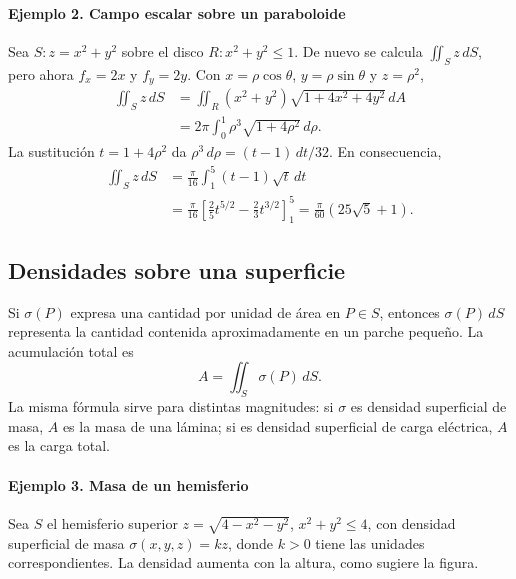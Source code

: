 \paragraph{Ejemplo 2. Campo escalar sobre un paraboloide}
Sea $S:z=x^2+y^2$ sobre el disco $R:x^2+y^2\leq1$. De nuevo se calcula $\iint_S z\,dS$, pero ahora $f_x=2x$ y $f_y=2y$. Con $x=\rho\cos\theta$, $y=\rho\sin\theta$ y $z=\rho^2$,
\begin{align*}
\iint_S z\,dS
&=\iint_R(x^2+y^2)\sqrt{1+4x^2+4y^2}\,dA\\
&=2\pi\int_0^1\rho^3\sqrt{1+4\rho^2}\,d\rho.
\end{align*}
La sustitución $t=1+4\rho^2$ da $\rho^3\,d\rho=(t-1)\,dt/32$. En consecuencia,
\begin{align*}
\iint_S z\,dS
&=\frac{\pi}{16}\int_1^5(t-1)\sqrt t\,dt\\
&=\frac{\pi}{16}
\left[\frac25t^{5/2}-\frac23t^{3/2}\right]_1^5
=\frac{\pi}{60}(25\sqrt5+1).
\end{align*}

\begingroup\shorthandoff{>}
\begin{center}
\end{center}
\endgroup

\subsection{Densidades sobre una superficie}

Si $\sigma(P)$ expresa una cantidad por unidad de área en $P\in S$, entonces $\sigma(P)\,dS$ representa la cantidad contenida aproximadamente en un parche pequeño. La acumulación total es
\[
A=\iint_S\sigma(P)\,dS.
\]
La misma fórmula sirve para distintas magnitudes: si $\sigma$ es densidad superficial de masa, $A$ es la masa de una lámina; si es densidad superficial de carga eléctrica, $A$ es la carga total. 
\paragraph{Ejemplo 3. Masa de un hemisferio}
Sea $S$ el hemisferio superior $z=\sqrt{4-x^2-y^2}$, $x^2+y^2\leq4$, con densidad superficial de masa $\sigma(x,y,z)=kz$, donde $k>0$ tiene las unidades correspondientes. La densidad aumenta con la altura, como sugiere la figura.

